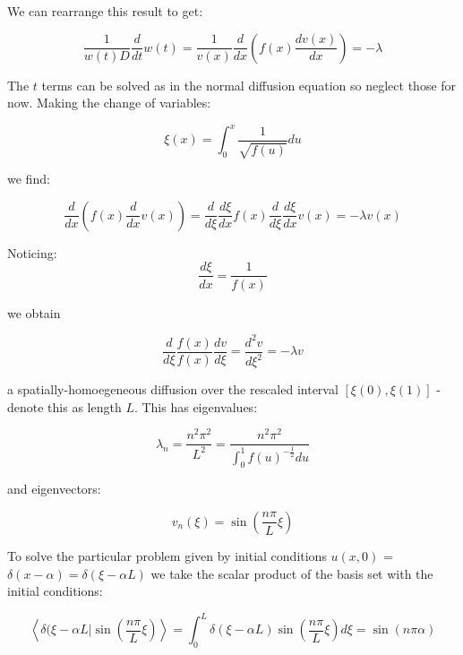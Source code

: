 \documentclass[11pt]{article} %
\begin{document}
We can rearrange this result to get:

\begin{equation}
\frac{1}{w(t)D}\frac{d}{dt}w(t) = \frac{1}{v(x)}\frac{d}{dx}\left(f(x)\frac{dv(x)}{dx}\right) = -\lambda
\end{equation}

The $t$ terms can be solved as in the normal diffusion equation so neglect those for now. Making the change of variables:

\begin{equation}
\xi(x)  =\int^{x}_{0}\frac{1}{\sqrt{f(u)}} du
\end{equation}

we find:

\begin{equation}
\frac{d}{dx}\left(f(x)\frac{d}{dx}v(x)\right) = \frac{d}{d\xi}\frac{d\xi}{dx}f(x)\frac{d}{d\xi}\frac{d\xi}{dx}v(x) = -\lambda v(x)
\end{equation}

Noticing:
\begin{equation}
\frac{d\xi}{dx} = \frac{1}{f(x)}
\end{equation}

we obtain

\begin{equation}
\frac{d}{d\xi}\frac{f(x)}{f(x)}\frac{d v}{d\xi} = \frac{d^{2} v}{d\xi^{2}} = -\lambda v
\end{equation}

a spatially-homoegeneous diffusion over the rescaled interval $[\xi(0), \xi(1)]$ - denote this as length $L$. This has eigenvalues:

\begin{equation}
\lambda_{n} = \frac{n^{2}\pi^{2}}{L^{2}} = \frac{n^{2}\pi^{2}}{\int^{1}_{0}f(u)^{-\frac{1}{2}}du}
\end{equation}

and eigenvectors:

\begin{equation}
v_{n}(\xi) = \sin(\frac{n\pi}{L}\xi)
\end{equation}

To solve the particular problem given by initial conditions $u(x, 0)$ = $\delta(x-\alpha) = \delta(\xi - \alpha L)$ we take the scalar product of the basis set with the initial conditions:

\begin{equation}
\left<\delta(\xi - \alpha L|\sin\left(\frac{n\pi}{L}\xi\right)\right> = \int^{L}_{0}\delta(\xi - \alpha L)\sin\left(\frac{n\pi}{L}\xi\right) d\xi = \sin(n\pi \alpha)
\end{equation}
\end{document}
